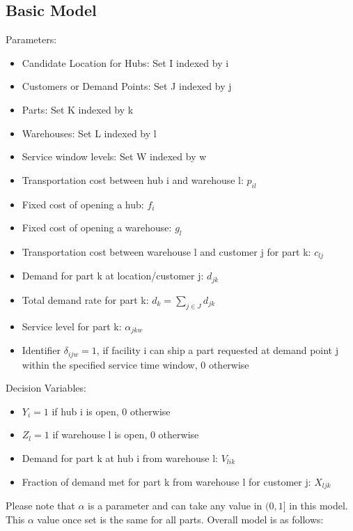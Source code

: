\documentclass[12pt]{article}
\numberwithin{equation}{section}
\begin{document}
\subsection{Basic Model}
Parameters:
\begin{itemize}
\item 
Candidate Location for Hubs: Set I indexed by i
\item 
Customers or Demand Points: Set J indexed by j
\item 
Parts: Set K indexed by k
\item
Warehouses: Set L indexed by l
\item
Service window levels: Set W indexed by w 
\item
Transportation cost between hub i and warehouse l: $p_{il}$
\item
Fixed cost of opening a hub: $f_i$
\item
Fixed cost of opening a warehouse: $g_l$
\item 
Transportation cost between warehouse l and customer j for part k: $c_{lj}$
\item 
Demand for part k at location/customer j: $d_{jk}$
\item
Total demand rate for part k: $d_{k} = \sum_{j\in J}d_{jk}$
\item
Service level for part k: $\alpha_{jkw}$
\item
Identifier $\delta_{ijw} = 1$, if facility i can ship a part requested at demand point j within the specified service time window, 0 otherwise  
\end{itemize}

Decision Variables:
\begin{itemize}
\item
$Y_i = 1$ if hub i is open, 0 otherwise
\item
$Z_l = 1$ if warehouse l is open, 0 otherwise
\item
Demand for part k at hub i from warehouse l: $V_{lik}$
\item
Fraction of demand met for part k from warehouse l for customer j: $X_{ljk}$
\end{itemize}
Please note that $\alpha$ is a parameter and can take any value in $(0,1]$ in this model. This $\alpha$ value once set is the same for all parts. Overall model is as follows:
\end{document}
